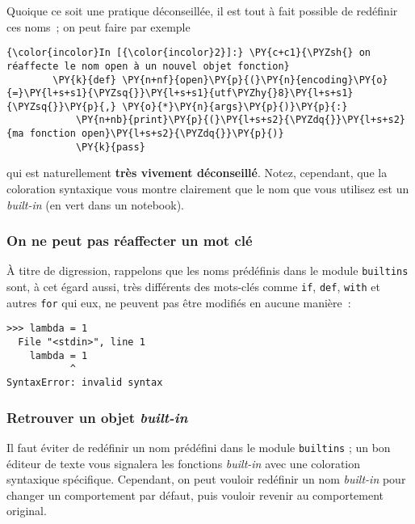     Quoique ce soit une pratique déconseillée, il est tout à fait possible
de redéfinir ces noms~; on peut faire par exemple

    \begin{Verbatim}[commandchars=\\\{\}]
{\color{incolor}In [{\color{incolor}2}]:} \PY{c+c1}{\PYZsh{} on réaffecte le nom open à un nouvel objet fonction}
        \PY{k}{def} \PY{n+nf}{open}\PY{p}{(}\PY{n}{encoding}\PY{o}{=}\PY{l+s+s1}{\PYZsq{}}\PY{l+s+s1}{utf\PYZhy{}8}\PY{l+s+s1}{\PYZsq{}}\PY{p}{,} \PY{o}{*}\PY{n}{args}\PY{p}{)}\PY{p}{:}
            \PY{n+nb}{print}\PY{p}{(}\PY{l+s+s2}{\PYZdq{}}\PY{l+s+s2}{ma fonction open}\PY{l+s+s2}{\PYZdq{}}\PY{p}{)}
            \PY{k}{pass}
\end{Verbatim}


    qui est naturellement \textbf{très vivement déconseillé}. Notez,
cependant, que la coloration syntaxique vous montre clairement que le
nom que vous utilisez est un \emph{built-in} (en vert dans un notebook).

    \hypertarget{on-ne-peut-pas-ruxe9affecter-un-mot-cluxe9}{%
\subsubsection{On ne peut pas réaffecter un mot
clé}\label{on-ne-peut-pas-ruxe9affecter-un-mot-cluxe9}}

    À titre de digression, rappelons que les noms prédéfinis dans le module
\texttt{builtins} sont, à cet égard aussi, très différents des mots-clés
comme \texttt{if}, \texttt{def}, \texttt{with} et autres \texttt{for}
qui eux, ne peuvent pas être modifiés en aucune manière~:

\begin{verbatim}
>>> lambda = 1
  File "<stdin>", line 1
    lambda = 1
           ^
SyntaxError: invalid syntax
\end{verbatim}

    \hypertarget{retrouver-un-objet-built-in}{%
\subsubsection{\texorpdfstring{Retrouver un objet
\emph{built-in}}{Retrouver un objet built-in}}\label{retrouver-un-objet-built-in}}

    Il faut éviter de redéfinir un nom prédéfini dans le module
\texttt{builtins} ; un bon éditeur de texte vous signalera les fonctions
\emph{built-in} avec une coloration syntaxique spécifique. Cependant, on
peut vouloir redéfinir un nom \emph{built-in} pour changer un
comportement par défaut, puis vouloir revenir au comportement original.

